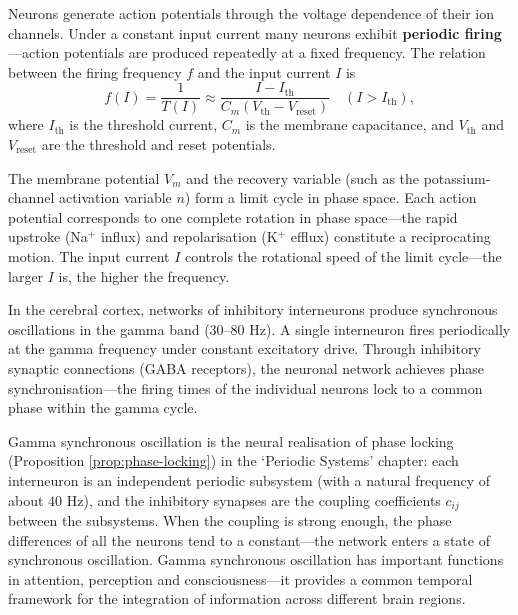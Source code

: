 \begin{definition}\label{def:neural_oscillation}
Neurons generate action potentials through the voltage dependence of their ion channels. Under a constant input current many neurons exhibit \textbf{periodic firing}---action potentials are produced repeatedly at a fixed frequency. The relation between the firing frequency $f$ and the input current $I$ is
\[
f(I) = \frac{1}{T(I)} \approx \frac{I - I_{\text{th}}}{C_m (V_{\text{th}} - V_{\text{reset}})} \quad (I > I_{\text{th}}),
\]
where $I_{\text{th}}$ is the threshold current, $C_m$ is the membrane capacitance, and $V_{\text{th}}$ and $V_{\text{reset}}$ are the threshold and reset potentials.

The membrane potential $V_m$ and the recovery variable (such as the potassium-channel activation variable $n$) form a limit cycle in phase space. Each action potential corresponds to one complete rotation in phase space---the rapid upstroke (Na$^+$ influx) and repolarisation (K$^+$ efflux) constitute a reciprocating motion. The input current $I$ controls the rotational speed of the limit cycle---the larger $I$ is, the higher the frequency.
\end{definition}

\begin{proposition}\label{prop:gamma_oscillation}
In the cerebral cortex, networks of inhibitory interneurons produce synchronous oscillations in the gamma band ($30$--$80$ Hz). A single interneuron fires periodically at the gamma frequency under constant excitatory drive. Through inhibitory synaptic connections (GABA receptors), the neuronal network achieves phase synchronisation---the firing times of the individual neurons lock to a common phase within the gamma cycle.

Gamma synchronous oscillation is the neural realisation of phase locking (Proposition \ref{prop:phase-locking}) in the `Periodic Systems' chapter: each interneuron is an independent periodic subsystem (with a natural frequency of about $40$ Hz), and the inhibitory synapses are the coupling coefficients $c_{ij}$ between the subsystems. When the coupling is strong enough, the phase differences of all the neurons tend to a constant---the network enters a state of synchronous oscillation. Gamma synchronous oscillation has important functions in attention, perception and consciousness---it provides a common temporal framework for the integration of information across different brain regions.
\end{proposition}

